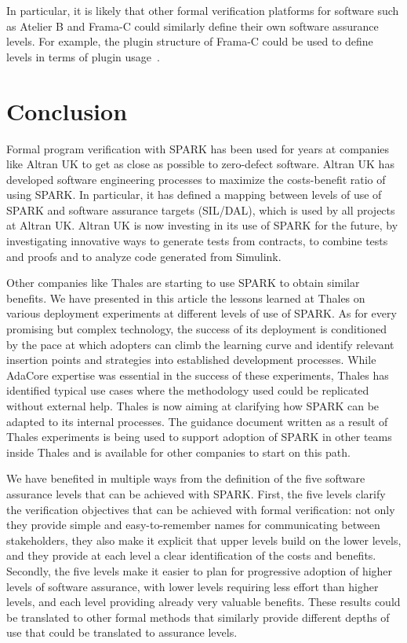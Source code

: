 \documentclass{llncs}
\begin{document}
In particular, it is likely that other formal verification platforms for
software such as Atelier B and Frama-C could similarly define their own
software assurance levels. For example, the plugin structure of Frama-C could
be used to define levels in terms of plugin usage~\cite{Kirchner2015}.

\section{Conclusion}

Formal program verification with SPARK has been used for years at companies
like Altran UK to get as close as possible to zero-defect software. Altran UK
has developed software engineering processes to maximize the costs-benefit
ratio of using SPARK. In particular, it has defined a mapping between levels of
use of SPARK and software assurance targets (SIL/DAL), which is used by all
projects at Altran UK. Altran UK is now investing in its use of SPARK for the
future, by investigating innovative ways to generate tests from contracts, to
combine tests and proofs and to analyze code generated from Simulink.

Other companies like Thales are starting to use SPARK to obtain similar
benefits. We have presented in this article the lessons learned at Thales on
various deployment experiments at different levels of use of SPARK. As for
every promising but complex technology, the success of its deployment is
conditioned by the pace at which adopters can climb the learning curve and
identify relevant insertion points and strategies into established development
processes. While AdaCore expertise was essential in the success of these
experiments, Thales has identified typical use cases where the methodology used
could be replicated without external help. Thales is now aiming at clarifying
how SPARK can be adapted to its internal processes. The guidance document
written as a result of Thales experiments is being used to support adoption of
SPARK in other teams inside Thales and is available for other companies to
start on this path.

We have benefited in multiple ways from the definition of the five software
assurance levels that can be achieved with SPARK. First, the five levels
clarify the verification objectives that can be achieved with formal
verification: not only they provide simple and easy-to-remember names for
communicating between stakeholders, they also make it explicit that upper
levels build on the lower levels, and they provide at each level a clear
identification of the costs and benefits. Secondly, the five levels make it
easier to plan for progressive adoption of higher levels of software assurance,
with lower levels requiring less effort than higher levels, and each level
providing already very valuable benefits. These results could be translated to
other formal methods that similarly provide different depths of use that could
be translated to assurance levels.




\end{document}
